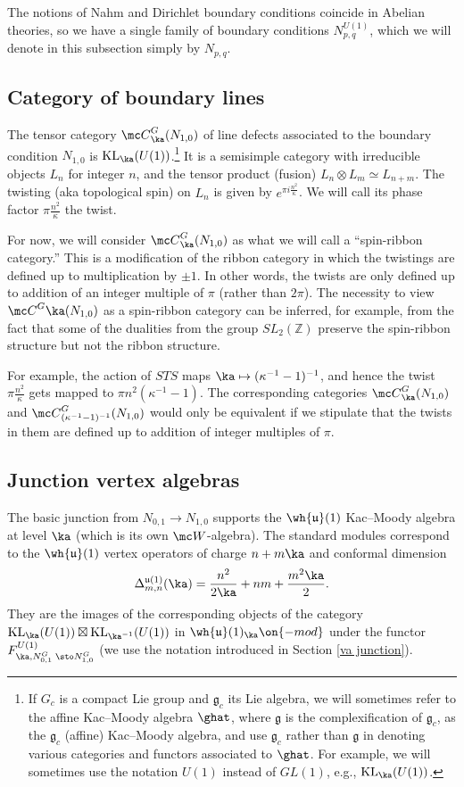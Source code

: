 \documentclass[11pt,reqno]{amsart}
\theoremstyle{plain}
\numberwithin{equation}{section}
\newcommand{\Z}{\mathbb{Z}}
\newcommand{\g}{\mathfrak{g}}
\DeclareMathOperator{\KL}{KL}
\theoremstyle{definition}
\begin{document}
The notions of Nahm and Dirichlet boundary conditions coincide in
Abelian theories, so we have a single family of boundary conditions
$N^{U(1)}_{p,q}$, which we will denote in this subsection simply by
$N_{p,q}$.

\subsection{Category of boundary lines}
The tensor category ${\mc C}^G_\ka(N_{1,0})$ of line defects
associated to the boundary condition $N_{1,0}$ is
$\KL_\ka(U(1))$.\footnote{If $G_c$ is a compact Lie group and $\g_c$
  its Lie algebra, we will sometimes refer to the affine Kac--Moody
  algebra $\ghat$, where $\g$ is the complexification of $\g_c$, as
  the $\g_c$ (affine) Kac--Moody algebra, and use $\g_c$ rather than
  $\g$ in denoting various categories and functors associated to
  $\ghat$. For example, we will sometimes use the notation $U(1)$
  instead of $GL(1)$, e.g., $\KL_\ka(U(1))$.} It is a semisimple
category with irreducible objects $L_n$ for integer $n$, and the
tensor product (fusion) $L_n \otimes L_{m} \simeq L_{n+m}$. The
twisting (aka topological spin) on $L_n$ is given by $e^{\pi i
  \frac{n^2}{\kappa}}$. We will call its phase factor $\pi
\frac{n^2}{\kappa}$ the twist.

For now, we will consider ${\mc C}^G_\ka(N_{1,0})$ as what we will
call a ``spin-ribbon category.'' This is a modification of the ribbon
category in which the twistings are defined up to multiplication by
$\pm 1$. In other words, the twists are only defined up to addition of
an integer multiple of $\pi$ (rather than $2\pi$). The necessity to
view ${\mc C}^G\ka(N_{1,0})$ as a spin-ribbon category can be
inferred, for example, from the fact that some of the dualities from
the group $SL_2(\Z)$ preserve the spin-ribbon structure but not the
ribbon structure. 

For example, the action of $STS$ maps $\ka \mapsto
(\kappa^{-1} -1)^{-1}$, and hence the twist $\pi \frac{n^2}{\kappa}$
gets mapped to $\pi n^2\left(\kappa^{-1} -1\right)$. The corresponding
categories ${\mc C}^G_\ka(N_{1,0})$ and ${\mc C}^G_{(\kappa^{-1}
  -1)^{-1}}(N_{1,0})$ would only be equivalent if we stipulate that
the twists in them are defined up to addition of integer multiples of
$\pi$.

\subsection{Junction vertex algebras}
The basic junction from $N_{0,1} \to N_{1,0}$ supports the
$\wh{\mathfrak{u}}(1)$ Kac--Moody algebra at level $\ka$ (which is its
own ${\mc W}$-algebra). The standard modules correspond to the
$\wh{\mathfrak{u}}(1)$ vertex operators of charge $n + m \ka$ and
conformal dimension
\begin{equation}
\Delta^{\mathfrak{u}(1)}_{m,n}(\ka) = \frac{n^2}{2 \ka} + n m +
\frac{m^2 \ka}{2}.
\end{equation}
They are the images of the corresponding objects of the category
$\KL_\ka(U(1)) \boxtimes \KL_{\ka^{-1}}(U(1))$ in
$\wh{\mathfrak{u}}(1)_\ka\on{-mod}$ under the functor
$F^{U(1)}_{\ka,N^G_{0,1}\; \sto N^G_{1,0}}$ (we use the notation
introduced in Section \ref{va junction}).
\end{document}
